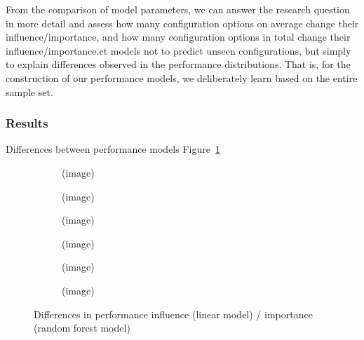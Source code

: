 From the comparison of model parameters, we can answer the research question in more detail and assess how many configuration options on average change their influence/importance, and how many configuration options in total change their influence/importance.ct models not to predict unseen configurations, but simply to explain differences observed in the performance distributions. That is, for the construction of our performance models, we deliberately learn based on the entire sample set.

\subsubsection{Results} {\color{red} Differences between performance models} Figure~\ref{fig:diff_performance_influences}

\begin{figure}
	\centering
	\begin{subfigure}{0.33\textwidth}
		\centering
		(image)
		\caption{\batik}
	\end{subfigure}
	\begin{subfigure}{0.33\textwidth}
		\centering
		(image)
		\caption{\dconvert}
	\end{subfigure}
	\begin{subfigure}{0.33\textwidth}
		\centering
		(image)
		\caption{\htwo}
	\end{subfigure}
	\begin{subfigure}{0.33\textwidth}
		\centering
		(image)
		\caption{\jumper}
	\end{subfigure}
	\begin{subfigure}{0.33\textwidth}
		\centering
		(image)
		\caption{\jadx}
	\end{subfigure}
	\begin{subfigure}{0.33\textwidth}
		\centering
		(image)
		\caption{\kanzi}
	\end{subfigure}
	\caption{Differences in performance influence (linear model) / importance (random forest model)}
	\label{fig:diff_performance_influences}
\end{figure}


